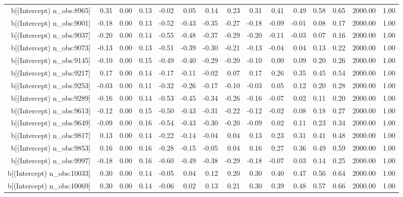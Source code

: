 \begin{table}[ht]
\begin{tabular}{rrrrrrrrrrrrrrr}
  b[(Intercept) n\_obs:8965] & 0.31 & 0.00 & 0.13 & -0.02 & 0.05 & 0.14 & 0.23 & 0.31 & 0.41 & 0.49 & 0.58 & 0.65 & 2000.00 & 1.00 \\ 
  b[(Intercept) n\_obs:9001] & -0.18 & 0.00 & 0.13 & -0.52 & -0.43 & -0.35 & -0.27 & -0.18 & -0.09 & -0.01 & 0.08 & 0.17 & 2000.00 & 1.00 \\ 
  b[(Intercept) n\_obs:9037] & -0.20 & 0.00 & 0.14 & -0.55 & -0.48 & -0.37 & -0.29 & -0.20 & -0.11 & -0.03 & 0.07 & 0.16 & 2000.00 & 1.00 \\ 
  b[(Intercept) n\_obs:9073] & -0.13 & 0.00 & 0.13 & -0.51 & -0.39 & -0.30 & -0.21 & -0.13 & -0.04 & 0.04 & 0.13 & 0.22 & 2000.00 & 1.00 \\ 
  b[(Intercept) n\_obs:9145] & -0.10 & 0.00 & 0.15 & -0.49 & -0.40 & -0.29 & -0.20 & -0.10 & 0.00 & 0.09 & 0.20 & 0.26 & 2000.00 & 1.00 \\ 
  b[(Intercept) n\_obs:9217] & 0.17 & 0.00 & 0.14 & -0.17 & -0.11 & -0.02 & 0.07 & 0.17 & 0.26 & 0.35 & 0.45 & 0.54 & 2000.00 & 1.00 \\ 
  b[(Intercept) n\_obs:9253] & -0.03 & 0.00 & 0.11 & -0.32 & -0.26 & -0.17 & -0.10 & -0.03 & 0.05 & 0.12 & 0.20 & 0.28 & 2000.00 & 1.00 \\ 
  b[(Intercept) n\_obs:9289] & -0.16 & 0.00 & 0.14 & -0.53 & -0.45 & -0.34 & -0.26 & -0.16 & -0.07 & 0.02 & 0.11 & 0.20 & 2000.00 & 1.00 \\ 
  b[(Intercept) n\_obs:9613] & -0.12 & 0.00 & 0.15 & -0.50 & -0.43 & -0.31 & -0.22 & -0.12 & -0.02 & 0.08 & 0.18 & 0.27 & 2000.00 & 1.00 \\ 
  b[(Intercept) n\_obs:9649] & -0.09 & 0.00 & 0.16 & -0.54 & -0.43 & -0.30 & -0.20 & -0.09 & 0.02 & 0.11 & 0.23 & 0.34 & 2000.00 & 1.00 \\ 
  b[(Intercept) n\_obs:9817] & 0.13 & 0.00 & 0.14 & -0.22 & -0.14 & -0.04 & 0.04 & 0.13 & 0.23 & 0.31 & 0.41 & 0.48 & 2000.00 & 1.00 \\ 
  b[(Intercept) n\_obs:9853] & 0.16 & 0.00 & 0.16 & -0.28 & -0.15 & -0.05 & 0.04 & 0.16 & 0.27 & 0.36 & 0.49 & 0.59 & 2000.00 & 1.00 \\ 
  b[(Intercept) n\_obs:9997] & -0.18 & 0.00 & 0.16 & -0.60 & -0.49 & -0.38 & -0.29 & -0.18 & -0.07 & 0.03 & 0.14 & 0.25 & 2000.00 & 1.00 \\ 
  b[(Intercept) n\_obs:10033] & 0.30 & 0.00 & 0.14 & -0.05 & 0.04 & 0.12 & 0.20 & 0.30 & 0.40 & 0.47 & 0.56 & 0.64 & 2000.00 & 1.00 \\ 
  b[(Intercept) n\_obs:10069] & 0.30 & 0.00 & 0.14 & -0.06 & 0.02 & 0.13 & 0.21 & 0.30 & 0.39 & 0.48 & 0.57 & 0.66 & 2000.00 & 1.00 \\ 

\end{tabular}
\end{table}

